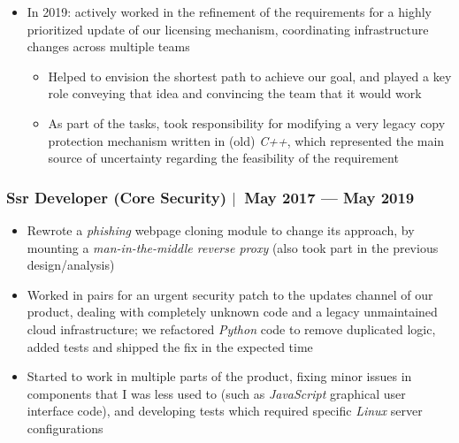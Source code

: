 \documentclass[12pt, a4paper]{article}
\newcommand{\mysep}{{\Large $\mid$}\ }
\newcommand{\python}{\emph{Python}}
\newcommand{\cpp}{\emph{C++}}
\begin{document}
\begin{itemize}
\begin{itemize}
        \end{itemize}
        \item In 2019: actively worked in the refinement of the requirements
        for a highly prioritized update of our licensing mechanism,
        coordinating infrastructure changes across multiple teams
        \begin{itemize}
            \item Helped to envision the shortest path to achieve our goal,
            and played a key role conveying that idea
            and convincing the team that it would work
            \item As part of the tasks, took responsibility for modifying
            a very legacy copy protection mechanism written in (old) \cpp{},
            which represented the main source of uncertainty
            regarding the feasibility of the requirement
        \end{itemize}
    \end{itemize}

    \subsubsection*{Ssr Developer (Core Security) \mysep May 2017 --- May 2019}
    \begin{itemize}
        \item Rewrote a \emph{phishing} webpage cloning module to change its approach,
        by mounting a \emph{man-in-the-middle reverse proxy}
        (also took part in the previous design/analysis)
        \item Worked in pairs for an urgent security patch
        to the updates channel of our product,
        dealing with completely unknown code
        and a legacy unmaintained cloud infrastructure;
        we refactored \python{} code to remove duplicated logic,
        added tests and shipped the fix in the expected time
        \item Started to work in multiple parts of the product,
        fixing minor issues in components that I was less used to
        (such as \emph{JavaScript} graphical user interface code),
        and developing tests which required specific \emph{Linux} server configurations
    \end{itemize}
\end{document}
